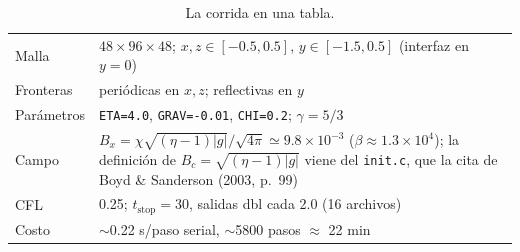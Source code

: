 \documentclass[11pt,a4paper]{article}
\begin{document}
\begin{table}[H]
\centering\small
\caption{La corrida en una tabla.}
\begin{tabular}{@{}p{2.5cm}p{12.9cm}@{}}
\toprule
Malla & $48\times96\times48$; $x,z\in[-0.5,0.5]$, $y\in[-1.5,0.5]$ (interfaz en $y=0$) \\
Fronteras & periódicas en $x,z$; reflectivas en $y$ \\
Parámetros & \texttt{ETA=4.0}, \texttt{GRAV=-0.01}, \texttt{CHI=0.2}; $\gamma=5/3$ \\
Campo & $B_x=\chi\sqrt{(\eta-1)|g|}/\sqrt{4\pi}\simeq 9.8\times10^{-3}$ ($\beta\approx1.3\times10^4$); la definición de $B_c=\sqrt{(\eta-1)|g|}$ viene del \texttt{init.c}, que la cita de Boyd \& Sanderson (2003, p.~99) \cite{boyd2003} \\
CFL & 0.25; $t_\mathrm{stop}=30$, salidas dbl cada 2.0 (16 archivos) \\
Costo & $\sim$0.22 s/paso serial, $\sim$5800 pasos $\approx$ 22 min \\
\bottomrule
\end{tabular}
\end{table}
\end{document}
